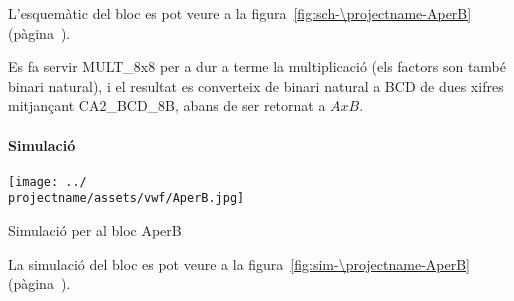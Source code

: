 L'esquemàtic del bloc es pot veure a la figura~\ref{fig:sch-\projectname-AperB} (pàgina~\pageref{fig:sch-\projectname-AperB}).

Es fa servir \textsf{MULT\_8x8} per a dur a terme la multiplicació
(els factors son també binari natural), i el resultat es converteix
de binari natural a BCD de dues xifres mitjançant \textsf{CA2\_BCD\_8B},
abans de ser retornat a $AxB$.

\paragraph{Simulació}

\begin{contendfig}
  \begin{center}
    \texttt{[image: ../\\projectname/assets/vwf/AperB.jpg]}
  \end{center}
  \caption{\label{fig:sim-\projectname-AperB} Simulació per al bloc \textsf{AperB}}
\end{contendfig}

La simulació del bloc es pot veure a la figura~\ref{fig:sim-\projectname-AperB} (pàgina~\pageref{fig:sim-\projectname-AperB}).


\vspace{1cm}

